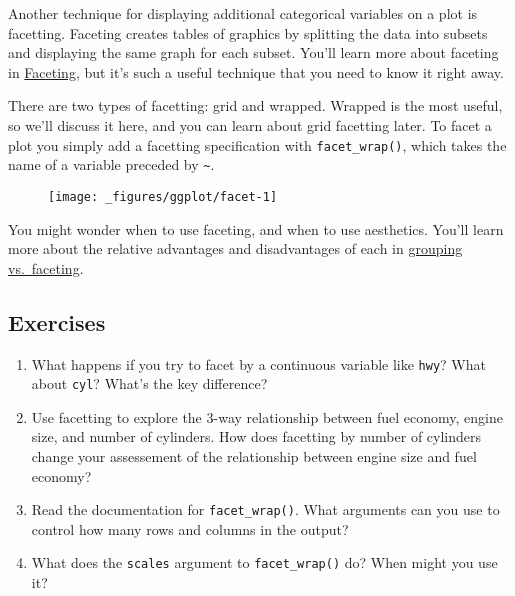 Another technique for displaying additional categorical variables on a
plot is facetting. Faceting creates tables of graphics by splitting the
data into subsets and displaying the same graph for each subset. You'll
learn more about faceting in \hyperref[sec:faceting]{Faceting}, but it's
such a useful technique that you need to know it right away.

There are two types of facetting: grid and wrapped. Wrapped is the most
useful, so we'll discuss it here, and you can learn about grid facetting
later. To facet a plot you simply add a facetting specification with
\texttt{facet\_wrap()}, which takes the name of a variable preceded by
\texttt{\textasciitilde{}}. 

\begin{Shaded}
\begin{Highlighting}[]
\StringTok{ }
\StringTok{  }\NormalTok{() +}\StringTok{ }
\StringTok{  }
\end{Highlighting}
\end{Shaded}

\begin{figure}[H]
  \texttt{[image: \_figures/ggplot/facet-1]}
\end{figure}

You might wonder when to use faceting, and when to use aesthetics.
You'll learn more about the relative advantages and disadvantages of
each in \hyperref[sub:group-vs-facet]{grouping vs.~faceting}.

\subsection{Exercises}

\begin{enumerate}
\def\labelenumi{\arabic{enumi}.}
\item
  What happens if you try to facet by a continuous variable like
  \texttt{hwy}? What about \texttt{cyl}? What's the key difference?
\item
  Use facetting to explore the 3-way relationship between fuel economy,
  engine size, and number of cylinders. How does facetting by number of
  cylinders change your assessement of the relationship between engine
  size and fuel economy?
\item
  Read the documentation for \texttt{facet\_wrap()}. What arguments can
  you use to control how many rows and columns in the output?
\item
  What does the \texttt{scales} argument to \texttt{facet\_wrap()} do?
  When might you use it?
\end{enumerate}

